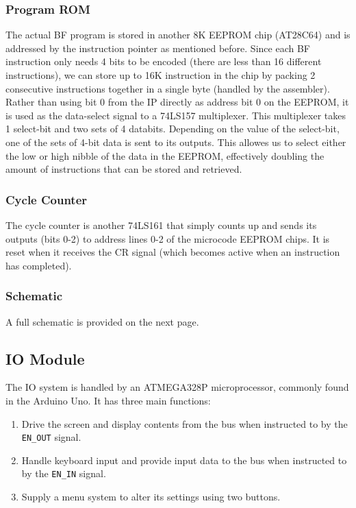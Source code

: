 \subsubsection{Program ROM}
The actual BF program is stored in another 8K EEPROM chip (AT28C64) and is addressed by the instruction pointer as mentioned before. Since each BF instruction only needs 4 bits to be encoded (there are less than 16 different instructions), we can store up to 16K instruction in the chip by packing 2 consecutive instructions together in a single byte (handled by the assembler). Rather than using bit 0 from the IP directly as address bit 0 on the EEPROM, it is used as the data-select signal to a 74LS157 multiplexer. This multiplexer takes 1 select-bit and two sets of 4 databits. Depending on the value of the select-bit, one of the sets of 4-bit data is sent to its outputs. This allowes us to select either the low or high nibble of the data in the EEPROM, effectively doubling the amount of instructions that can be stored and retrieved.
 
\subsubsection{Cycle Counter}
The cycle counter is another 74LS161 that simply counts up and sends its outputs (bits 0-2) to address lines 0-2 of the microcode EEPROM chips. It is reset when it receives the CR signal (which becomes active when an instruction has completed).


\subsubsection{Schematic}
A full schematic is provided on the next page.


\subsection{IO Module}
The IO system is handled by an ATMEGA328P microprocessor, commonly found in the Arduino Uno. It has three main functions:
\begin{enumerate}
\item Drive the screen and display contents from the bus when instructed to by the \texttt{EN\_OUT} signal.
\item Handle keyboard input and provide input data to the bus when instructed to by the \texttt{EN\_IN} signal.
\item Supply a menu system to alter its settings using two buttons.
\end{enumerate}

